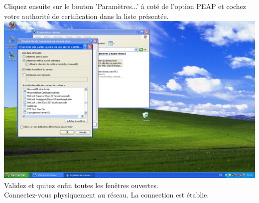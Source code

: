 Cliquez ensuite sur le bouton 'Paramètres...' à coté de l'option PEAP et cochez votre authorité de certification dans la liste présentée.\\
\includegraphics[width=\screenShotSize{}]{img/tlsParams.PNG}\\
Validez et quitez enfin toutes les fenêtres ouvertes.\\
Connectez-vous physiquement au réseau. La connection est établie.






